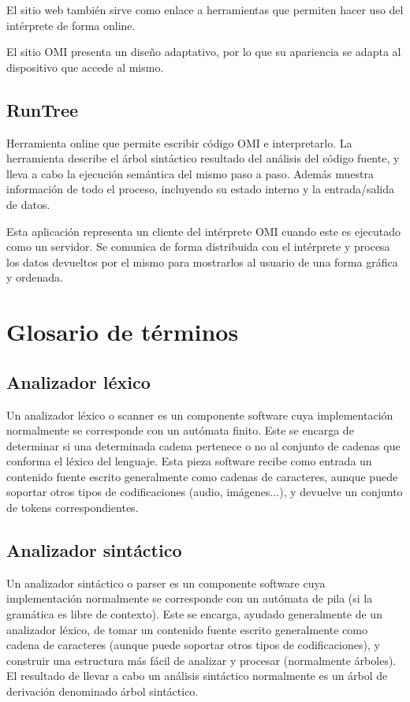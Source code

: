 El sitio web también sirve como enlace a herramientas que permiten hacer uso del intérprete de forma online.

El sitio OMI presenta un diseño adaptativo, por lo que su apariencia se adapta al dispositivo que accede al mismo. 

\subsection{RunTree} 
Herramienta online que permite escribir código OMI e interpretarlo. La herramienta describe el árbol sintáctico resultado del análisis del código fuente, y lleva a cabo la ejecución
semántica del mismo paso a paso. Además muestra información de todo el proceso, incluyendo su estado interno y la entrada/salida de datos. 

Esta aplicación representa un cliente del intérprete OMI cuando este es ejecutado como un servidor. Se comunica de forma distribuida con el intérprete y procesa los datos devueltos por el mismo
para mostrarlos al usuario de una forma gráfica y ordenada.   

\section{Glosario de términos}



\subsection {Analizador léxico}
Un analizador léxico o scanner es un componente software cuya implementación normalmente se corresponde con un autómata finito. Este se encarga de determinar si una determinada cadena pertenece o no al conjunto de cadenas 
que conforma el léxico del lenguaje. Esta pieza software recibe como entrada un contenido fuente escrito generalmente como cadenas de caracteres, aunque puede soportar otros tipos de codificaciones
(audio, imágenes...), y devuelve un conjunto de tokens correspondientes. 

\subsection {Analizador sintáctico}
Un analizador sintáctico o parser es un componente software cuya implementación normalmente se corresponde con un autómata de pila (si la gramática es libre de contexto). Este se encarga, ayudado generalmente de un analizador léxico,
de tomar un contenido fuente escrito generalmente como cadena de caracteres (aunque puede soportar otros tipos de codificaciones), y construir una estructura más fácil de analizar y procesar 
(normalmente árboles). El resultado de llevar a cabo un análisis sintáctico normalmente es un árbol de derivación denominado árbol sintáctico. 

